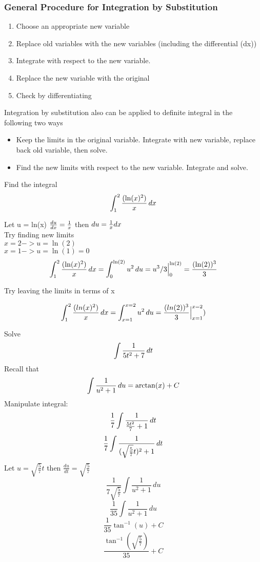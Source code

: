 \documentclass[english, 12pt]{article}
\begin{document}
\subsubsection*{General Procedure for Integration by Substitution}
\begin{enumerate}
\item Choose an appropriate new variable
\item Replace old variables with the new variables (including the differential (dx))
\item Integrate with respect to the new variable.
\item Replace the new variable with the original
\item Check by differentiating
\end{enumerate}
Integration by substitution also can be applied to definite integral in the following two ways
\begin{itemize}
\item Keep the limits in the original variable. Integrate with new variable, replace back old variable, then solve.
\item Find the new limits with respect to the new variable. Integrate and solve.
\end{itemize}
 
\begin{exmp}
Find the integral
\[ \int_1^2 \frac{(\ln(x)^{2})}{x}\,dx \]
\begin{sol}
Let u = ln(x)
$\frac{du}{dx} = \frac{1}{x}$ then $du = \frac{1}{x} dx$\\
Try finding new limits\\
$x=2 -> u=\ln(2)$\\
$x=1 -> u=\ln(1)=0$
\[ \int_1^2 \frac{(\ln(x)^{2})}{x}\,dx=\int_{0}^{\ln(2)} u^2\, du = u^3 /3 \Big|_0^{\ln(2)} = \frac{(\ln(2))^3}{3} \]

Try leaving the limits in terms of x

\[ \int_1^2 \frac{(ln(x)^{2})}{x}\,dx =  \int_{x=1}^{x=2} u^2\,du = \frac{(ln(2))^3}{3}\Big|_{x=1}^{x=2} ) \]
\end{sol}
\end{exmp}

\begin{exercise}
Solve
\[ \int \frac{1}{5t^2+7}\,dt\]
Recall that 
\[\int \frac{1}{u^2+1}\,du = \arctan(x) + C\]
Manipulate integral:
\[ \frac 1 7 \int \frac{1}{\frac{5t^2}{7}+1}\,dt\]
\[ \frac 1 7 \int \frac{1}{(\sqrt{\frac{5}{7}}t)^2+1}\,dt\]
Let $u = \sqrt{\frac{5}{7}} t$ then $\frac{du}{dt}=\sqrt{\frac{5}{7}}$
\[\frac{1}{7\sqrt{\frac{5}{7}}} \int \frac{1}{u^2+1}\,du\]
\[\frac{1}{35} \int \frac{1}{u^2+1}\,du\]
\[\frac{1}{35} \tan^{-1}(u) + C\]
\[\frac{\tan^{-1}(\sqrt{\frac{5}{7}})}{35}  + C\]
\end{exercise}
\end{document}
